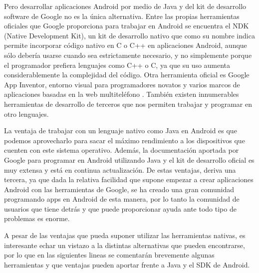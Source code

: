 \documentclass[
10pt, %
a4paper, %
oneside, %
headinclude,footinclude, %
BCOR5mm, %
]{scrartcl}
\begin{document}
Pero desarrollar aplicaciones Android por medio de Java y del kit de desarrollo software de Google no es la única alternativa. Entre las propias herramientas oficiales que Google proporciona para trabajar en Android se encuentra el NDK (Native Development Kit), un kit de desarrollo nativo que como su nombre indica permite incorporar código nativo en C o C++ en aplicaciones Android, aunque sólo debería usarse cuando sea estrictamente necesario, y no simplemente porque el programador prefiera lenguajes como C++ o C, ya que su uso aumenta considerablemente la complejidad del código. Otra herramienta oficial es Google App Inventor, entorno visual para programadores novatos y varios marcos de aplicaciones basadas en la web multiteléfono . También existen innumerables herramientas de desarrollo de terceros que nos permiten trabajar y programar en otro lenguajes.

La ventaja de trabajar con un lenguaje nativo como Java en Android es que podemos aprovecharlo para sacar el máximo rendimiento a los dispositivos que cuenten con este sistema operativo. Además, la documentación aportada por Google para programar en Android utilizando Java y el kit de desarrollo oficial es muy extensa y está en continua actualización. De estas ventajas, deriva una tercera, ya que dada la relativa facilidad que supone empezar a crear aplicaciones Android con las herramientas de Google, se ha creado una gran comunidad programando apps en Android de esta manera, por lo tanto la comunidad de usuarios que tiene detrás y que puede proporcionar ayuda ante todo tipo de problemas es enorme.

A pesar de las ventajas que pueda suponer utilizar las herramientas nativas, es interesante echar un vistazo a la distintas alternativas que pueden encontrarse, por lo que en las siguientes lineas se comentarán brevemente algunas herramientas y que ventajas pueden aportar frente a Java y el SDK de Android.
\end{document}

